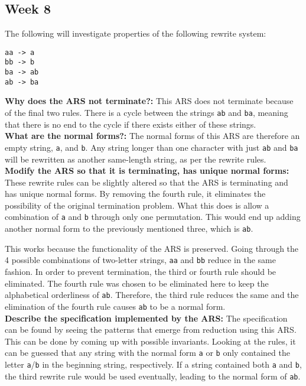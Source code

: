 \documentclass{article}
\theoremstyle{theorem}
\theoremstyle{definition}
\theoremstyle{remark}
\begin{document}
\newpage

\subsection{Week 8}
The following will investigate properties of the following rewrite system:
\begin{lstlisting}
aa -> a
bb -> b
ba -> ab
ab -> ba
\end{lstlisting}

\noindent \textbf{Why does the ARS not terminate?: } This ARS does not terminate because of the final two rules. There is a cycle between the strings \texttt{ab} and \texttt{ba}, meaning that there is no end to the cycle if there exists either of these strings.\\

\noindent \textbf{What are the normal forms?: } The normal forms of this ARS are therefore an empty string, \texttt{a}, and \texttt{b}. Any string longer than one character with just \texttt{ab} and \texttt{ba} will be rewritten as another same-length string, as per the rewrite rules.\\

\noindent \textbf{Modify the ARS so that it is terminating, has unique normal forms: } These rewrite rules can be slightly altered so that the ARS is terminating and has unique normal forms. By removing the fourth rule, it eliminates the possibility of the original termination problem. What this does is allow a combination of \texttt{a} and \texttt{b} through only one permutation. This would end up adding another normal form to the previously mentioned three, which is \texttt{ab}.

This works because the functionality of the ARS is preserved. Going through the 4 possible combinations of two-letter strings, \texttt{aa} and \texttt{bb} reduce in the same fashion. In order to prevent termination, the third or fourth rule should be eliminated. The fourth rule was chosen to be eliminated here to keep the alphabetical orderliness of \texttt{ab}. Therefore, the third rule reduces the same and the elimination of the fourth rule causes \texttt{ab} to be a normal form.\\

\noindent \textbf{Describe the specification implemented by the ARS: } The specification can be found by seeing the patterns that emerge from reduction using this ARS. This can be done by coming up with possible invariants. Looking at the rules, it can be guessed that any string with the normal form \texttt{a} or \texttt{b} only contained the letter \texttt{a}/\texttt{b} in the beginning string, respectively. If a string contained both \texttt{a} and \texttt{b}, the third rewrite rule would be used eventually, leading to the normal form of \texttt{ab}. 
\end{document}
